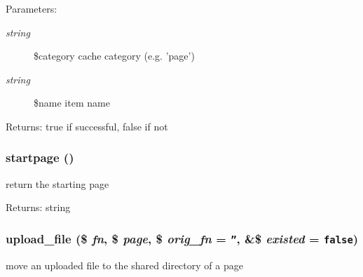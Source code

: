 \begin{Desc}
\item[Parameters:]
\begin{description}
\item[{\em string}]\$category cache category (e.g. 'page') \item[{\em string}]\$name item name \end{description}
\end{Desc}
\begin{Desc}
\item[Returns:]true if successful, false if not \end{Desc}
\hypertarget{common_8inc_8php_0a3ee1e9beca572266648f17b9c4c75f}{
\subsubsection[{startpage}]{\setlength{\rightskip}{0pt plus 5cm}startpage ()}}
\label{common_8inc_8php_0a3ee1e9beca572266648f17b9c4c75f}


return the starting page

\begin{Desc}
\item[Returns:]string \end{Desc}
\hypertarget{common_8inc_8php_4659077c34b709eec75f9897ea07e55a}{
\subsubsection[{upload\_\-file}]{\setlength{\rightskip}{0pt plus 5cm}upload\_\-file (\$ {\em fn}, \/  \$ {\em page}, \/  \$ {\em orig\_\-fn} = {\tt ''}, \/  \&\$ {\em existed} = {\tt false})}}
\label{common_8inc_8php_4659077c34b709eec75f9897ea07e55a}


move an uploaded file to the shared directory of a page

